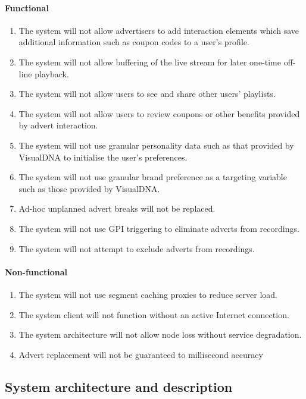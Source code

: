 \paragraph{Functional}
		\begin{enumerate}
			\item{The system will not allow advertisers to add interaction elements which save additional information such as coupon codes to a user's profile.}
			\item{The system will not allow buffering of the live stream for later one-time off-line playback.}
			\item{The system will not allow users to see and share other users' playlists.}
			\item{The system will not allow users to review coupons or other benefits provided by advert interaction.}
			\item{The system will not use granular personality data such as that provided by VisualDNA to initialise the user's preferences.}
			\item{The system will not use granular brand preference as a targeting variable such as those provided by VisualDNA.}
			\item{Ad-hoc unplanned advert breaks will not be replaced.}
			\item{The system will not use GPI triggering to eliminate adverts from recordings.}
			\item{The system will not attempt to exclude adverts from recordings.}
		\end{enumerate}
\paragraph{Non-functional}
		\begin{enumerate}
			\item{The system will not use segment caching proxies to reduce server load.}
			\item{The system client will not function without an active Internet connection.}
			\item{The system architecture will not allow node loss without service degradation.}
			\item{Advert replacement will not be guaranteed to millisecond accuracy}
		\end{enumerate}

\subsection{System architecture and description}

